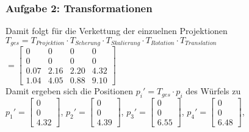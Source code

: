 \documentclass[accentcolor=tud9c,colorbacktitle,inverttitle,landscape,german,presentation,t]{tudbeamer}
\begin{document}
\begin{frame}
	\frametitle{Aufgabe 2: Transformationen}
	Damit folgt für die Verkettung der einzuelnen Projektionen\\
	$T_{ges}=T_{Projektion} \cdot T_{Scherung} \cdot T_{Skalierung} \cdot T_{Rotation} \cdot T_{Translation}$\\
	$=\begin{bmatrix}
	 0 &  0 &  0 &  0\\
	 0 &  0 & 0 &  0\\
	 0.07 &  2.16 &  2.20 &  4.32\\
	 1.04 &  4.05 &   0.88 &  9.10
	\end{bmatrix}$\\
	Damit ergeben sich die Positionen $p_i'=T_{ges} \cdot p_i $ des Würfels zu\\
	{\small 
	$p_1'=\begin{bmatrix}  0\\0\\ 4.32 \end{bmatrix}$, %
	$p_2'=\begin{bmatrix}  0\\0\\4.39 \end{bmatrix}$, %
	$p_3'=\begin{bmatrix}  0\\0\\6.55 \end{bmatrix}$, %
	$p_4'=\begin{bmatrix}  0\\0\\6.48 \end{bmatrix}$,\\ %
}
\end{frame}
\end{document}
